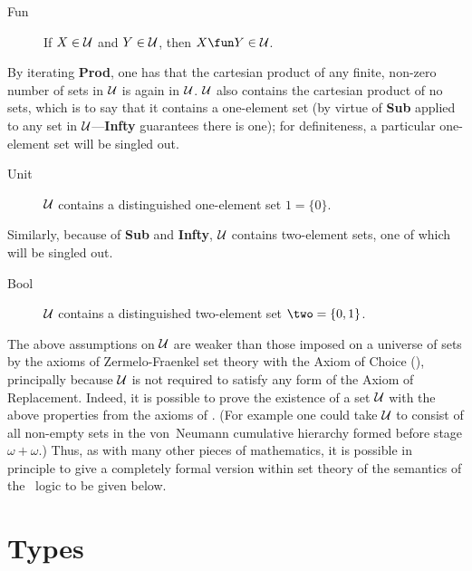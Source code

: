 \begin{description} 

\item[Fun] If $X\in{\cal U}$ and $Y\in{\cal U}$, then $X\fun Y\in{\cal U}$.

\end{description}
By iterating {\bf Prod}, one has that the cartesian product of any
finite, non-zero number of sets in $\cal U$ is again in $\cal U$.
$\cal U$ also contains the cartesian product of no sets, which is to
say that it contains a one-element set (by virtue of {\bf Sub} applied
to any set in ${\cal U}$---{\bf Infty} guarantees there is one); for
definiteness, a particular one-element set will be singled out.
\begin{description}

\item[Unit] $\cal U$ contains a distinguished one-element set $1=\{0\}$.

\end{description}
Similarly, because of {\bf Sub} and {\bf Infty}, $\cal U$ contains
two-element sets, one of which will be singled out.
\begin{description}

\item[Bool] $\cal U$ contains a distinguished two-element set
$\two=\{0,1\}$.

\end{description}

The above assumptions on $\cal U$ are weaker than those imposed on a
universe of sets by the axioms of
Zermelo-Fraenkel set theory with the
Axiom of Choice (), 
principally because $\cal U$ is not
required to satisfy any form of the Axiom of 
Replacement. 
Indeed, it is possible to prove the existence of a set
$\cal U$ with the above properties from the axioms of .
(For example one could take $\cal U$ to consist of all non-empty sets
in the von~Neumann cumulative hierarchy formed before stage
$\omega+\omega$.) Thus, as with many other pieces of mathematics, it is
possible in principle to give a completely formal version within
 set theory of the semantics of the \HOL\ logic to be given
below. 

\section{Types}
\label{types}

